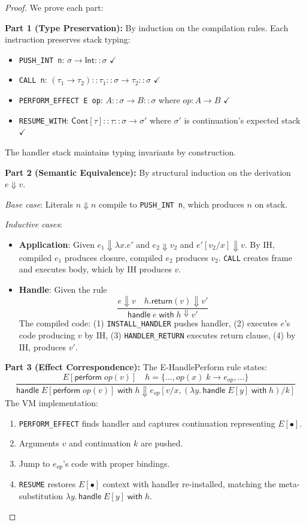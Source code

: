 \begin{proof}
We prove each part:

\textbf{Part 1 (Type Preservation):}
By induction on the compilation rules. Each instruction preserves stack typing:
\begin{itemize}
  \item \texttt{PUSH\_INT n}: $\sigma \to \mathsf{Int} :: \sigma$ $\checkmark$
  \item \texttt{CALL n}: $(\tau_1 \to \tau_2) :: \tau_1 :: \sigma \to \tau_2 :: \sigma$ $\checkmark$
  \item \texttt{PERFORM\_EFFECT E op}: $A :: \sigma \to B :: \sigma$ where $\mathit{op} : A \to B$ $\checkmark$
  \item \texttt{RESUME\_WITH}: $\mathsf{Cont}[\tau] :: \tau :: \sigma \to \sigma'$ where $\sigma'$ is continuation's expected stack $\checkmark$
\end{itemize}
The handler stack maintains typing invariants by construction.

\textbf{Part 2 (Semantic Equivalence):}
By structural induction on the derivation $e \Downarrow v$.

\emph{Base case}: Literals $n \Downarrow n$ compile to \texttt{PUSH\_INT n}, which produces $n$ on stack.

\emph{Inductive cases}:
\begin{itemize}
  \item \textbf{Application}: Given $e_1 \Downarrow \lambda x. e'$ and $e_2 \Downarrow v_2$ and $e'[v_2/x] \Downarrow v$.
  By IH, compiled $e_1$ produces closure, compiled $e_2$ produces $v_2$.
  \texttt{CALL} creates frame and executes body, which by IH produces $v$.

  \item \textbf{Handle}: Given the rule
  \[
  \frac{e \Downarrow v \quad h.\mathsf{return}(v) \Downarrow v'}{\mathsf{handle}\; e\; \mathsf{with}\; h \Downarrow v'}
  \]
  The compiled code:
  (1) \texttt{INSTALL\_HANDLER} pushes handler,
  (2) executes $e$'s code producing $v$ by IH,
  (3) \texttt{HANDLER\_RETURN} executes return clause,
  (4) by IH, produces $v'$.
\end{itemize}

\textbf{Part 3 (Effect Correspondence):}
The E-HandlePerform rule states:
\[
\frac{E[\mathsf{perform}\; \mathit{op}(v)] \quad h = \{\ldots, \mathit{op}(x)\; k \to e_{op}, \ldots\}}
     {\mathsf{handle}\; E[\mathsf{perform}\; \mathit{op}(v)]\; \mathsf{with}\; h \Downarrow e_{op}[v/x, (\lambda y.\, \mathsf{handle}\; E[y]\; \mathsf{with}\; h)/k]}
\]
The VM implementation:
\begin{enumerate}
  \item \texttt{PERFORM\_EFFECT} finds handler and captures continuation representing $E[\bullet]$.
  \item Arguments $v$ and continuation $k$ are pushed.
  \item Jump to $e_{op}$'s code with proper bindings.
  \item \texttt{RESUME} restores $E[\bullet]$ context with handler re-installed, matching the meta-substitution $\lambda y.\, \mathsf{handle}\; E[y]\; \mathsf{with}\; h$.
\end{enumerate}


\end{proof}
